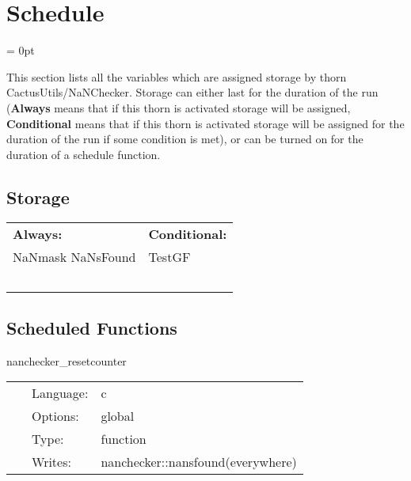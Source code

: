 
\section{Schedule} 


\parskip = 0pt


\noindent This section lists all the variables which are assigned storage by thorn CactusUtils/NaNChecker.  Storage can either last for the duration of the run ({\bf Always} means that if this thorn is activated storage will be assigned, {\bf Conditional} means that if this thorn is activated storage will be assigned for the duration of the run if some condition is met), or can be turned on for the duration of a schedule function.


\subsection*{Storage}

\hspace{5mm}

 \begin{tabular*}{160mm}{ll} 

{\bf Always:}& {\bf Conditional:} \\ 
 NaNmask NaNsFound &  TestGF\\ 
~ & ~\\ 
\end{tabular*} 


\subsection*{Scheduled Functions}
\vspace{5mm}


\hspace{5mm} nanchecker\_resetcounter 

\hspace{5mm}{\it reset the nanchecker::nansfound counter } 


\hspace{5mm}

 \begin{tabular*}{160mm}{cll} 
~ & Language:  & c \\ 
~ & Options:  & global \\ 
~ & Type:  & function \\ 
~ & Writes:  & nanchecker::nansfound(everywhere) \\ 
\end{tabular*} 



